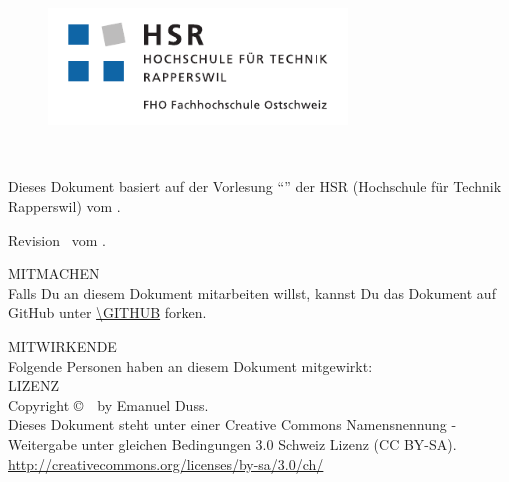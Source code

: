 %
%

\begin{titlepage}
  \maketitle
  \thispagestyle{empty}
  \vfill
  \begin{figure}[!htbp]
    \centering
    \includegraphics[width=300px]{hsr_logo.pdf}
  \end{figure}
\end{titlepage}

\thispagestyle{empty}
\SUBJECT \\
\TITLE

Dieses Dokument basiert auf der Vorlesung "`\TITLE"' der
HSR (Hochschule für Technik Rapperswil) vom \SEMESTER.

Revision \REVISION~vom \REVISIONDATE.
\vfill

\uppercase{Mitmachen} \\
Falls Du an diesem Dokument mitarbeiten willst, kannst Du das Dokument
auf GitHub unter \url{\GITHUB} forken.

\uppercase{Mitwirkende} \\
Folgende Personen haben an diesem Dokument mitgewirkt: \\


\uppercase{Lizenz} \\
Copyright \copyright~\YEAR~by Emanuel Duss. \\
Dieses Dokument steht unter einer Creative Commons Namensnennung -
Weitergabe unter gleichen Bedingungen 3.0 Schweiz Lizenz (CC BY-SA). \\
\url{http://creativecommons.org/licenses/by-sa/3.0/ch/}

{\huge \ccbysa}

\tableofcontents
\setcounter{page}{1}

